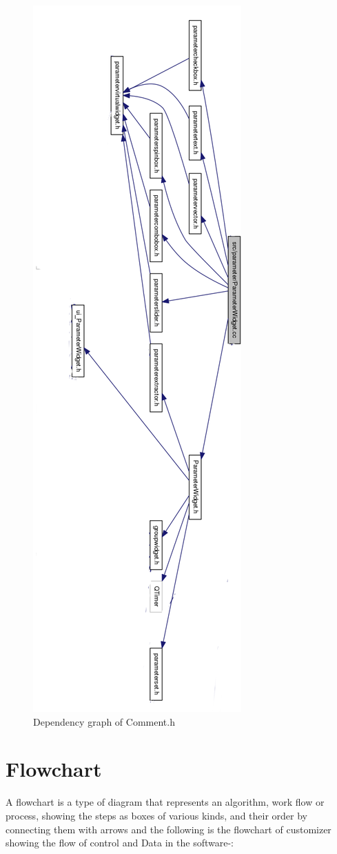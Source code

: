 \begin{figure}
\centering
\includegraphics[width=0.4\linewidth]{images/dependene}
\caption{ Dependency graph of Comment.h}
\label{fig:dependency}
\end{figure}


\section{Flowchart}
A flowchart is a type of diagram that represents an algorithm, work flow or process, showing the steps as boxes of various kinds, and their order by connecting them with arrows
and the following is the flowchart of customizer showing the flow of control and Data in the software-:

